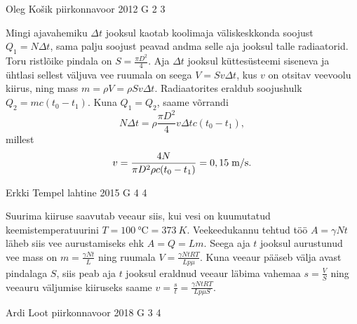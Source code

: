 \documentclass[11pt, twoside]{article}
\begin{document}
{%
{Oleg Košik} %
{piirkonnavoor} %
{2012} %
{G 2} %
{3} %
{

\ifSolution
Mingi ajavahemiku $\Delta t$ jooksul kaotab koolimaja väliskeskkonda soojust $Q_1=N\Delta t$, sama palju soojust peavad andma selle aja jooksul talle radiaatorid. Toru ristlõike pindala on $S=\frac{\pi D^2}{4}$. Aja $\Delta t$ jooksul küttesüsteemi siseneva ja ühtlasi sellest väljuva vee ruumala on seega $V=Sv\Delta t$, kus $v$ on otsitav veevoolu kiirus, ning mass $m=\rho V=\rho Sv\Delta t$. Radiaatorites eraldub soojushulk $Q_2=mc(t_0-t_1)$. Kuna $Q_1=Q_2$, saame võrrandi
\[
N\Delta t=\rho \frac{\pi D^2}{4}v\Delta t c (t_0-t_1),
\]
millest
\[
v=\frac{4N}{\pi D^2\rho c (t_0-t_1)}=0,15\;\hbox{m/s}.
\]
\fi
}

{Erkki Tempel} %
{lahtine} %
{2015} %
{G 4} %
{4} %
{

\ifSolution
Suurima kiiruse saavutab veeaur siis, kui vesi on kuumutatud keemistemperatuurini $T=\SI{100}{\celsius}=\SI{373}{K}$. Veekeedukannu tehtud töö $A=\gamma Nt$ läheb siis vee aurustamiseks ehk $A=Q=Lm$. Seega aja $t$ jooksul aurustunud vee mass on $m=\frac{\gamma Nt}{L}$ ning ruumala $V=\frac{\gamma NtRT}{Lp\mu}$. Kuna veeaur pääseb välja avast pindalaga $S$, siis peab aja $t$ jooksul eraldnud veeaur läbima vahemaa $s=\frac{V}{S}$ ning veeauru väljumise kiiruseks saame
$v=\frac{s}{t}=\frac{\gamma NtRT}{Lp\mu S}$.
\fi
}

{Ardi Loot} %
{piirkonnavoor} %
{2018} %
{G 3} %
{4} %
{

}}
\end{document}
